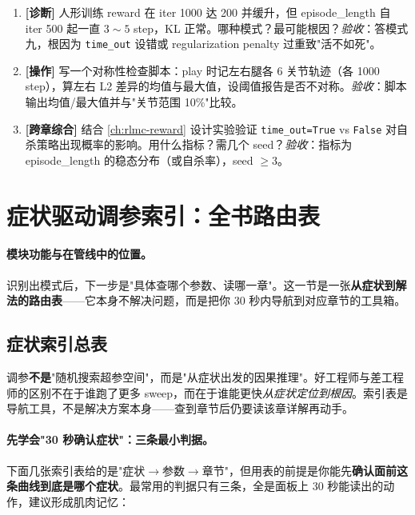 \begin{practice}[本节动手任务]
\begin{enumerate}
  \item \textbf{[诊断]} 人形训练 reward 在 iter 1000 达 200 并缓升，但 episode\_length 自 iter 500 起一直 $3\sim5$ step，KL 正常。哪种模式？最可能根因？\emph{验收}：答模式九，根因为 \verb|time_out| 设错或 regularization penalty 过重致"活不如死"。
  \item \textbf{[操作]} 写一个对称性检查脚本：play 时记左右腿各 6 关节轨迹（各 1000 step），算左右 L2 差异的均值与最大值，设阈值报告是否不对称。\emph{验收}：脚本输出均值/最大值并与"关节范围 10\%"比较。
  \item \textbf{[跨章综合]} 结合 \cref{ch:rlmc-reward} 设计实验验证 \verb|time_out=True| vs \verb|False| 对自杀策略出现概率的影响。用什么指标？需几个 seed？\emph{验收}：指标为 episode\_length 的稳态分布（或自杀率），seed $\ge 3$。
\end{enumerate}
\end{practice}

\section{症状驱动调参索引：全书路由表}
\label{sec:rlmc-diag-index}

\paragraph{模块功能与在管线中的位置。}识别出模式后，下一步是"具体查哪个参数、读哪一章"。这一节是一张\textbf{从症状到解法的路由表}——它本身不解决问题，而是把你 30 秒内导航到对应章节的工具箱。

\subsection{症状索引总表}

\begin{insight}\label{ins:rlmc-diag-causal}
调参\textbf{不是}"随机搜索超参空间"，而是"从症状出发的因果推理"。好工程师与差工程师的区别不在于谁跑了更多 sweep，而在于谁能更快\emph{从症状定位到根因}。索引表是导航工具，不是解决方案本身——查到章节后仍要读该章详解再动手。
\end{insight}

\paragraph{先学会"30 秒确认症状"：三条最小判据。}下面几张索引表给的是"症状$\to$参数$\to$章节"，但用表的前提是你能先\textbf{确认面前这条曲线到底是哪个症状}。最常用的判据只有三条，全是面板上 30 秒能读出的动作，建议形成肌肉记忆：

